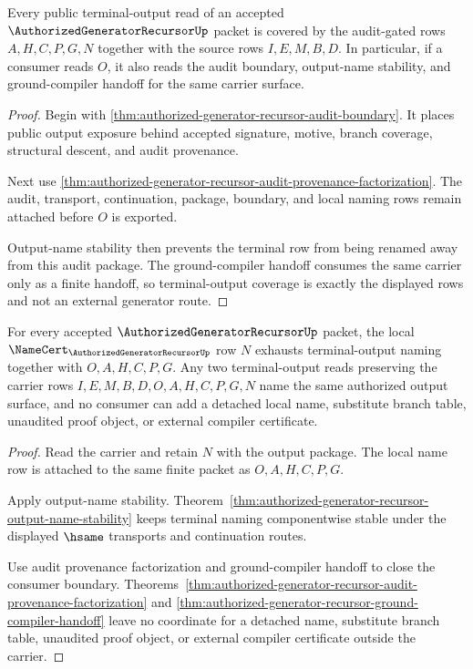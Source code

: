 \begin{theorem}
\label{thm:authorized-generator-recursor-audit-gated-output-coverage}
Every public terminal-output read of an accepted $\AuthorizedGeneratorRecursorUp$ packet is covered by the audit-gated rows $A,H,C,P,G,N$ together with the source rows $I,E,M,B,D$. In particular, if a consumer reads $O$, it also reads the audit boundary, output-name stability, and ground-compiler handoff for the same carrier surface.
\end{theorem}
\begin{proof}
Begin with \autoref{thm:authorized-generator-recursor-audit-boundary}. It places public output exposure behind accepted signature, motive, branch coverage, structural descent, and audit provenance.

Next use \autoref{thm:authorized-generator-recursor-audit-provenance-factorization}. The audit, transport, continuation, package, boundary, and local naming rows remain attached before $O$ is exported.

Output-name stability then prevents the terminal row from being renamed away from this audit package. The ground-compiler handoff consumes the same carrier only as a finite handoff, so terminal-output coverage is exactly the displayed rows and not an external generator route.
\end{proof}

\begin{theorem}
\label{thm:authorized-generator-recursor-local-name-output-exhaustion}
For every accepted $\AuthorizedGeneratorRecursorUp$ packet, the local $\NameCert_{\AuthorizedGeneratorRecursorUp}$ row $N$ exhausts terminal-output naming together with $O,A,H,C,P,G$. Any two terminal-output reads preserving the carrier rows $I,E,M,B,D,O,A,H,C,P,G,N$ name the same authorized output surface, and no consumer can add a detached local name, substitute branch table, unaudited proof object, or external compiler certificate.
\end{theorem}
\begin{proof}
Read the carrier and retain $N$ with the output package. The local name row is attached to the same finite packet as $O,A,H,C,P,G$.

Apply output-name stability. Theorem~\ref{thm:authorized-generator-recursor-output-name-stability} keeps terminal naming componentwise stable under the displayed $\hsame$ transports and continuation routes.

Use audit provenance factorization and ground-compiler handoff to close the consumer boundary. Theorems~\ref{thm:authorized-generator-recursor-audit-provenance-factorization} and \ref{thm:authorized-generator-recursor-ground-compiler-handoff} leave no coordinate for a detached name, substitute branch table, unaudited proof object, or external compiler certificate outside the carrier.
\end{proof}
